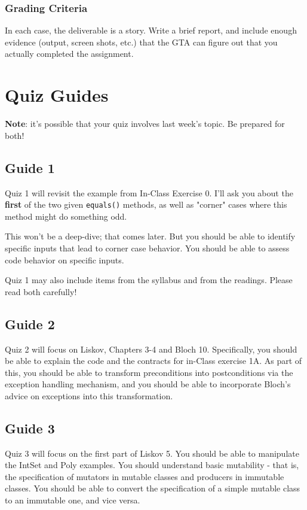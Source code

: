 \documentclass[11pt]{article}
\begin{document}
\subsubsection{Grading Criteria}
\label{sec:orgcd2f961}
In each case, the deliverable is a story. Write a brief report, and include enough evidence (output, screen shots, etc.) that the GTA can figure out that you actually completed the assignment.

\section{Quiz Guides}
\label{sec:org467ad92}
\textbf{Note}: it's possible that your quiz involves last week's topic. Be prepared for both!


\subsection{Guide 1}
\label{sec:org609e664}
Quiz 1 will revisit the example from In-Class Exercise 0. I'll ask you about the \textbf{first} of the two given \texttt{equals()} methods, as well as "corner" cases where this method might do something odd.

This won't be a deep-dive; that comes later. But you should be able to identify specific inputs that lead to corner case behavior. You should be able to assess code behavior on specific inputs.

Quiz 1 may also include items from the syllabus and from the readings. Please read both carefully!

\subsection{Guide 2}
\label{sec:orgb776807}
Quiz 2 will focus on Liskov, Chapters 3-4 and Bloch 10. Specifically, you should be able to explain the code and the contracts for in-Class exercise 1A. As part of this, you should be able to transform preconditions into postconditions via the exception handling mechanism, and you should be able to incorporate Bloch's advice on exceptions into this transformation.


\subsection{Guide 3}
\label{sec:orga829d7c}
Quiz 3 will focus on the first part of Liskov 5. You should be able to manipulate the IntSet and Poly examples. You should understand basic mutability - that is, the specification of mutators in mutable classes and producers in immutable classes. You should be able to convert the specification of a simple mutable class to an immutable one, and vice versa.
\end{document}
